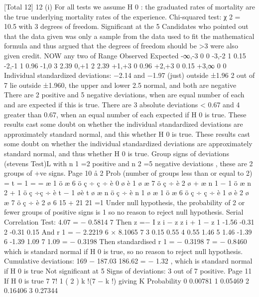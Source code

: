 [Total 12]
12
(i)
For all tests we assume H 0 : the graduated rates of mortality are the true
underlying mortality rates of the experience.
Chi-squared test: χ 2 = 10.5 with 3 degrees of freedom.
Significant at the 5%
Candidates who pointed out that the data given was only a sample from
the data used to fit the mathematical formula and thus argued that the
degrees of freedom should be >3 were also given credit.
NOW any two of
Range
Observed
Expected
-∞,-3
0
0
-3,-2
1
0.15
-2,-1
1
0.96
-1,0
3
2.39
0,+1
2
2.39
+1,+3
0
0.96
+2,+3
0
0.15
+3,∞
0
0
Individual standardized deviations: −2.14 and −1.97 (just) outside ±1.96
2 out of 7 lie outside ±1.960, the upper and lower 2.5%
normal, and both are negative
There are 2 positive and 5 negative deviations, when are equal number of
each and are expected if this is true.
There are 3 absolute deviations < 0.67 and 4 greater than 0.67, when an
equal number of each expected if H 0 is true.
These results cast some doubt on whether the individual standardized
deviations are approximately standard normal, and this whether H 0 is
true.
These results cast some doubt on whether the individual standardized
deviations are approximately standard normal, and thus whether H 0 is
true.
Group signs of deviations (stevens Test)L with n 1 =2 positive and n 2 =5
negative deviations , these are 2 groups of +ve signs.
Page 10%
å
2
Prob (number of groups less than or equal to 2) =
t = 1
=
=
æ 1 ö æ 6 ö
ç ÷ ç ÷
è 0 ø è 1 ø
æ 7 ö
ç ÷
è 2 ø
+
æ n 1 − 1 ö æ n 2 + 1 ö
ç
÷ç
÷
è t − 1 øè t ø
æ n ö
ç ÷
è n 1 ø
æ 1 ö æ 6 ö
ç ÷ ç ÷
è 1 ø è 2 ø
æ 7 ö
ç ÷
è 2 ø
6 15
+
21 21
=1
Under null hypothesis, the probability of 2 or fewer groups of positive
signs is 1 so no reason to reject null hypothesis.
Serial Correlation Test:
4.07
= − 0.5814
7
Then
z =−
I
z i − z
z i + 1 − z
1
-1.56
-0.31
2
-0.31
0.15
And r 1 =
− 2.2219
6 × 8.1065
7
3
0.15
0.55
4
0.55
1.46
5
1.46
-1.39
6
-1.39
1.09
7
1.09
= − 0.3198
Then standardised r 1 = − 0.3198 7 = − 0.8460
which is standard normal if H 0 is true, so no reason to reject null
hypothesis.
Cumulative deviations:
169 − 187.03
186.62
= − 1.32 , which is standard normal if H 0 is true
Not significant at 5%
Signs of deviations: 3 out of 7 positive.
Page 11%
If H 0 is true
7
7!
1
(
2 )
k !(7 − k !)
giving
K
Probability
0
0.00781
1
0.05469
2
0.16406
3
0.27344
